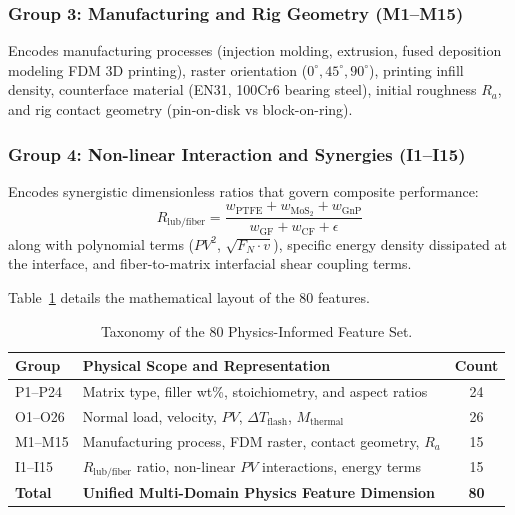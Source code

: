 \documentclass[10pt,twocolumn,a4paper]{article}
\begin{document}
\subsubsection{Group 3: Manufacturing and Rig Geometry (M1--M15)}
Encodes manufacturing processes (injection molding, extrusion, fused deposition modeling FDM 3D printing), raster orientation ($0^\circ, 45^\circ, 90^\circ$), printing infill density, counterface material (EN31, 100Cr6 bearing steel), initial roughness $R_a$, and rig contact geometry (pin-on-disk vs block-on-ring).

\subsubsection{Group 4: Non-linear Interaction and Synergies (I1--I15)}
Encodes synergistic dimensionless ratios that govern composite performance:
\begin{equation}
    R_{\text{lub/fiber}} = \frac{w_{\text{PTFE}} + w_{\text{MoS}_2} + w_{\text{GnP}}}{w_{\text{GF}} + w_{\text{CF}} + \epsilon}
    \label{eq:lub_fiber_ratio}
\end{equation}
along with polynomial terms ($PV^2$, $\sqrt{F_N \cdot v}$), specific energy density dissipated at the interface, and fiber-to-matrix interfacial shear coupling terms.

Table~\ref{tab:feature_groups} details the mathematical layout of the 80 features.

\begin{table}[t]
\centering
\caption{Taxonomy of the 80 Physics-Informed Feature Set.}
\label{tab:feature_groups}
\small
\begin{tabular}{lp{5.2cm}c}
\toprule
\textbf{Group} & \textbf{Physical Scope and Representation} & \textbf{Count} \\
\midrule
P1--P24 & Matrix type, filler wt\%, stoichiometry, and aspect ratios & 24 \\
O1--O26 & Normal load, velocity, $PV$, $\Delta T_{\text{flash}}$, $M_{\text{thermal}}$ & 26 \\
M1--M15 & Manufacturing process, FDM raster, contact geometry, $R_a$ & 15 \\
I1--I15 & $R_{\text{lub/fiber}}$ ratio, non-linear $PV$ interactions, energy terms & 15 \\
\midrule
\textbf{Total} & \textbf{Unified Multi-Domain Physics Feature Dimension} & \textbf{80} \\
\bottomrule
\end{tabular}
\end{table}
\end{document}
